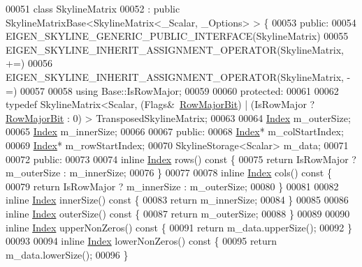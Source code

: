 \begin{DoxyCode}
00051 \textcolor{keyword}{class }SkylineMatrix
00052 : \textcolor{keyword}{public} SkylineMatrixBase<SkylineMatrix<\_Scalar, \_Options> > \{
00053 \textcolor{keyword}{public}:
00054     EIGEN\_SKYLINE\_GENERIC\_PUBLIC\_INTERFACE(SkylineMatrix)
00055     EIGEN\_SKYLINE\_INHERIT\_ASSIGNMENT\_OPERATOR(SkylineMatrix, +=)
00056     EIGEN\_SKYLINE\_INHERIT\_ASSIGNMENT\_OPERATOR(SkylineMatrix, -=)
00057 
00058     using Base::IsRowMajor;
00059 
00060 protected:
00061 
00062     typedef SkylineMatrix<Scalar, (Flags&~\hyperlink{group__flags_gae4f56c2a60bbe4bd2e44c5b19cbe8762}{RowMajorBit}) | (IsRowMajor ? 
      \hyperlink{group__flags_gae4f56c2a60bbe4bd2e44c5b19cbe8762}{RowMajorBit} : 0) > TransposedSkylineMatrix;
00063 
00064     \hyperlink{namespace_eigen_a62e77e0933482dafde8fe197d9a2cfde}{Index} m\_outerSize;
00065     \hyperlink{namespace_eigen_a62e77e0933482dafde8fe197d9a2cfde}{Index} m\_innerSize;
00066 
00067 public:
00068     \hyperlink{namespace_eigen_a62e77e0933482dafde8fe197d9a2cfde}{Index}* m\_colStartIndex;
00069     \hyperlink{namespace_eigen_a62e77e0933482dafde8fe197d9a2cfde}{Index}* m\_rowStartIndex;
00070     SkylineStorage<Scalar> m\_data;
00071 
00072 public:
00073 
00074     inline \hyperlink{namespace_eigen_a62e77e0933482dafde8fe197d9a2cfde}{Index} rows()\textcolor{keyword}{ const }\{
00075         \textcolor{keywordflow}{return} IsRowMajor ? m\_outerSize : m\_innerSize;
00076     \}
00077 
00078     \textcolor{keyword}{inline} \hyperlink{namespace_eigen_a62e77e0933482dafde8fe197d9a2cfde}{Index} cols()\textcolor{keyword}{ const }\{
00079         \textcolor{keywordflow}{return} IsRowMajor ? m\_innerSize : m\_outerSize;
00080     \}
00081 
00082     \textcolor{keyword}{inline} \hyperlink{namespace_eigen_a62e77e0933482dafde8fe197d9a2cfde}{Index} innerSize()\textcolor{keyword}{ const }\{
00083         \textcolor{keywordflow}{return} m\_innerSize;
00084     \}
00085 
00086     \textcolor{keyword}{inline} \hyperlink{namespace_eigen_a62e77e0933482dafde8fe197d9a2cfde}{Index} outerSize()\textcolor{keyword}{ const }\{
00087         \textcolor{keywordflow}{return} m\_outerSize;
00088     \}
00089 
00090     \textcolor{keyword}{inline} \hyperlink{namespace_eigen_a62e77e0933482dafde8fe197d9a2cfde}{Index} upperNonZeros()\textcolor{keyword}{ const }\{
00091         \textcolor{keywordflow}{return} m\_data.upperSize();
00092     \}
00093 
00094     \textcolor{keyword}{inline} \hyperlink{namespace_eigen_a62e77e0933482dafde8fe197d9a2cfde}{Index} lowerNonZeros()\textcolor{keyword}{ const }\{
00095         \textcolor{keywordflow}{return} m\_data.lowerSize();
00096     \}

\end{DoxyCode}
